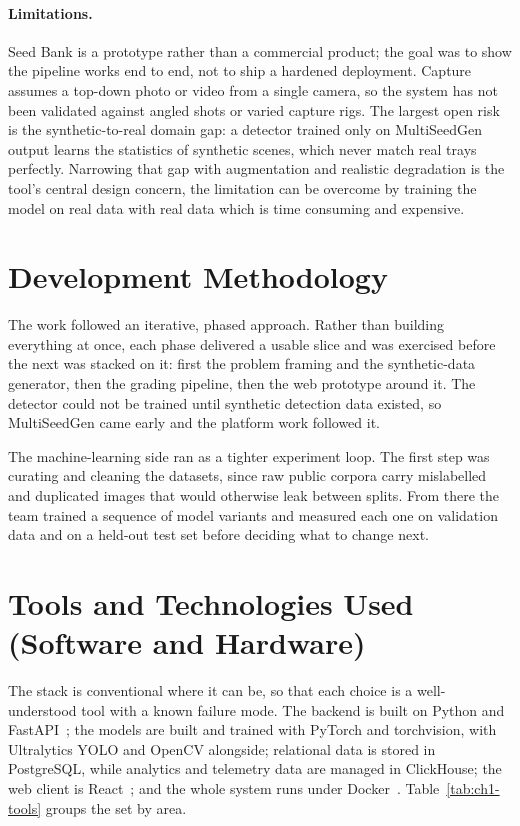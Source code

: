 \paragraph{Limitations.} Seed Bank is a prototype rather than a commercial product;
the goal was to show the pipeline works end to end, not to ship a hardened
deployment. Capture assumes a top-down photo or video from a single camera, so the system has
not been validated against angled shots or varied capture rigs. The largest open
risk is the synthetic-to-real domain gap: a detector trained only on MultiSeedGen
output learns the statistics of synthetic scenes, which never match real trays
perfectly. Narrowing that gap with augmentation and realistic degradation is the
tool's central design concern, the limitation can be overcome by training the model on real data with
real data which is time consuming and expensive.

\section{Development Methodology}

The work followed an iterative, phased approach. Rather than building everything at
once, each phase delivered a usable slice and was exercised before the next was
stacked on it: first the problem framing and the synthetic-data generator, then the
grading pipeline, then the web prototype around it. The detector could not be trained
until synthetic detection data existed, so MultiSeedGen came early and the platform
work followed it.

The machine-learning side ran as a tighter experiment loop. The first step was
curating and cleaning the datasets, since raw public corpora carry mislabelled and
duplicated images that would otherwise leak between splits. From there the team
trained a sequence of model variants and measured each one on validation data and on
a held-out test set before deciding what to change next.


\section{Tools and Technologies Used (Software and Hardware)}

The stack is conventional where it can be, so that each choice is a well-understood
tool with a known failure mode. The backend is built on Python and
FastAPI~\cite{fastapi}; the models are built and trained with PyTorch and
torchvision, with Ultralytics YOLO and OpenCV alongside; relational data is stored in
PostgreSQL, while analytics and telemetry data are managed in ClickHouse; the web client
is React~\cite{reactindepth}; and the whole system runs under
Docker~\cite{merkel2014docker}. Table~\ref{tab:ch1-tools} groups the set by area.

